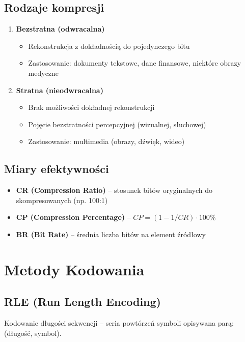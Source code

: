 \subsection{Rodzaje kompresji}
\begin{enumerate}
    \item \textbf{Bezstratna (odwracalna)}
    \begin{itemize}[noitemsep]
        \item Rekonstrukcja z dokładnością do pojedynczego bitu
        \item Zastosowanie: dokumenty tekstowe, dane finansowe, niektóre obrazy medyczne
    \end{itemize}
    
    \item \textbf{Stratna (nieodwracalna)}
    \begin{itemize}[noitemsep]
        \item Brak możliwości dokładnej rekonstrukcji
        \item Pojęcie bezstratności percepcyjnej (wizualnej, słuchowej)
        \item Zastosowanie: multimedia (obrazy, dźwięk, wideo)
    \end{itemize}
\end{enumerate}

\subsection{Miary efektywności}
\begin{itemize}[noitemsep]
    \item \textbf{CR (Compression Ratio)} -- stosunek bitów oryginalnych do skompresowanych (np. 100:1)
    \item \textbf{CP (Compression Percentage)} -- $CP = (1 - 1/CR) \cdot 100\%$
    \item \textbf{BR (Bit Rate)} -- średnia liczba bitów na element źródłowy
\end{itemize}

\section{Metody Kodowania}

\subsection{RLE (Run Length Encoding)}
Kodowanie długości sekwencji -- seria powtórzeń symboli opisywana parą: (długość, symbol).

